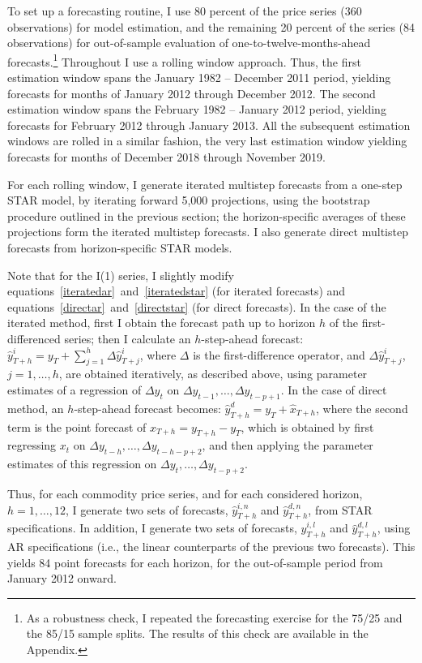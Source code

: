 \documentclass[11pt]{article}
\begin{document}
To set up a forecasting routine, I use 80 percent of the price series (360 observations) for model estimation, and the remaining 20 percent of the series (84 observations) for out-of-sample evaluation of one-to-twelve-months-ahead forecasts.\footnote{As a robustness check, I repeated the forecasting exercise for the 75/25 and the 85/15 sample splits. The results of this check are available in the Appendix.} Throughout I use a rolling window approach. Thus, the first estimation window spans the January 1982 -- December 2011 period, yielding forecasts for months of January 2012 through December 2012. The second estimation window spans the February 1982 -- January 2012 period, yielding forecasts for February 2012 through January 2013. All the subsequent estimation windows are rolled in a similar fashion, the very last estimation window yielding forecasts for months of December 2018 through November 2019. 

For each rolling window, I generate iterated multistep forecasts from a one-step STAR model, by iterating forward 5,000 projections, using the bootstrap procedure outlined in the previous section; the horizon-specific averages of these projections form the iterated multistep forecasts. I also generate direct multistep forecasts from horizon-specific STAR models. 

Note that for the I(1) series, I slightly modify equations~\eqref{iteratedar}~and~\eqref{iteratedstar} (for iterated forecasts) and equations~\eqref{directar}~and~\eqref{directstar} (for direct forecasts). In the case of the iterated method, first I obtain the forecast path up to horizon $h$ of the first-differenced series; then I calculate an $h$-step-ahead forecast: $\hat{y}_{T+h}^i = y_{T} + \sum_{j=1}^{h}\Delta\hat{y}_{T+j}^i$, where $\Delta$ is the first-difference operator, and $\Delta\hat{y}_{T+j}^i$, $j=1,\ldots,h$, are obtained iteratively, as described above, using parameter estimates of a regression of $\Delta y_t$ on $\Delta y_{t-1},\ldots,\Delta y_{t-p+1}$. In the case of direct method, an $h$-step-ahead forecast becomes: $\hat{y}_{T+h}^d = y_{T} + \hat{x}_{T+h}$, where the second term is the point forecast of $x_{T+h} = y_{T+h} - y_{T}$, which is obtained by first regressing $x_t$ on $\Delta y_{t-h},\ldots,\Delta y_{t-h-p+2}$, and then applying the parameter estimates of this regression on $\Delta y_{t},\ldots,\Delta y_{t-p+2}$. 

Thus, for each commodity price series, and for each considered horizon, $h=1,\ldots,12$, I generate two sets of forecasts, $\hat{y}_{T+h}^{i,n}$ and $\hat{y}_{T+h}^{d,n}$, from STAR specifications. In addition, I generate two sets of forecasts, $\hat{y}_{T+h}^{i,l}$ and $\hat{y}_{T+h}^{d,l}$, using AR specifications (i.e., the linear counterparts of the previous two forecasts). This yields 84 point forecasts for each horizon, for the out-of-sample period from January 2012 onward.
\end{document}
